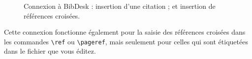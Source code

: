 \documentclass[11pt,french]{article}
\newcommand{\TS}{\textsf{\TeX Shop}}
\newcommand{\cmd}[1]{\textsf{#1}}
\newcommand{\mnu}[1]{\textsf{#1}}
\newcommand{\To}{\,\(\to\)\,}
\begin{document}
%
\begin{figure}
\centering
{}%
\hfill%
%
\caption[BibDesk Plugin Use.]{
Connexion à \textsf{BibDesk} :  insertion d'une citation ; et
 insertion de références croisées.}
\label{fig:bibdesk}
\end{figure}

Cette connexion fonctionne également pour la saisie des références croisées dans les commandes \verb|\ref| ou \verb|\pageref|, mais seulement pour celles qui sont étiquetées dans le fichier que vous éditez.
\end{document}
